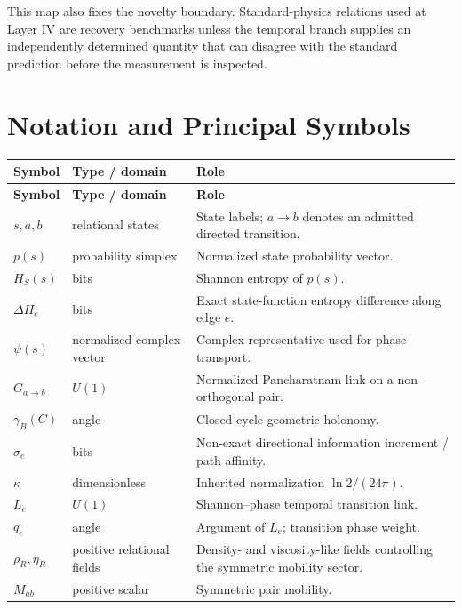 \documentclass[11pt]{book}
\begin{document}
This map also fixes the novelty boundary. Standard-physics relations used at Layer IV are recovery benchmarks unless the temporal branch supplies an independently determined quantity that can disagree with the standard prediction before the measurement is inspected.

\chapter*{Notation and Principal Symbols}

\small
\setlength{\LTpre}{0pt}
\setlength{\LTpost}{0pt}
\begin{longtable}{p{}p{}p{}}
\toprule
\textbf{Symbol} & \textbf{Type / domain} & \textbf{Role} \\
\midrule
\endfirsthead
\toprule
\textbf{Symbol} & \textbf{Type / domain} & \textbf{Role} \\
\midrule
\endhead
\(s,a,b\) & relational states & State labels; \(a\to b\) denotes an admitted directed transition. \\
\(p(s)\) & probability simplex & Normalized state probability vector. \\
\(H_S(s)\) & bits & Shannon entropy of \(p(s)\). \\
\(\Delta H_e\) & bits & Exact state-function entropy difference along edge \(e\). \\
\(\psi(s)\) & normalized complex vector & Complex representative used for phase transport. \\
\(G_{a\to b}\) & \(U(1)\) & Normalized Pancharatnam link on a non-orthogonal pair. \\
\(\gamma_B(C)\) & angle & Closed-cycle geometric holonomy. \\
\(\sigma_e\) & bits & Non-exact directional information increment / path affinity. \\
\(\kappa\) & dimensionless & Inherited normalization \(\ln2/(24\pi)\). \\
\(L_e\) & \(U(1)\) & Shannon--phase temporal transition link. \\
\(q_e\) & angle & Argument of \(L_e\); transition phase weight. \\
\(\rho_R,\eta_R\) & positive relational fields & Density- and viscosity-like fields controlling the symmetric mobility sector. \\
\(M_{ab}\) & positive scalar & Symmetric pair mobility. \\

\end{longtable}
\end{document}
